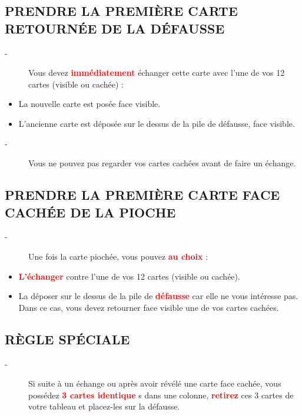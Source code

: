 \documentclass{scrartcl}%
\begin{document}
%
\subsection{ PRENDRE LA PREMIÈRE CARTE RETOURNÉE DE LA DÉFAUSSE
}%
\label{subsec:PRENDRELAPREMIRECARTERETOURNEDELADFAUSSE}%
\begin{description}%
\item[{-} ]%
%
 Vous devez %
\textcolor{red}{%
\textbf{immédiatement}%
}%
\textit{ }%
 échanger cette carte avec l’une de vos 12 cartes (visible ou cachée) :
%
\end{description}%
\begin{itemize}%
\item%
%
 La nouvelle carte est posée face visible.
%
\item%
%
 L'ancienne carte est déposée sur le dessus de la pile de défausse, face visible.
%
\end{itemize}%
\begin{description}%
\item[{-} ]%
%
 Vous ne pouvez pas regarder vos cartes cachées avant de faire un échange.
%
\end{description}

%
\subsection{ PRENDRE LA PREMIÈRE CARTE FACE CACHÉE DE LA PIOCHE
}%
\label{subsec:PRENDRELAPREMIRECARTEFACECACHEDELAPIOCHE}%
\begin{description}%
\item[{-} ]%
%
Une fois la carte piochée, vous pouvez %
\textcolor{red}{%
\textbf{au choix}%
}%
\textit{ }%
 :
%
\end{description}%
\begin{itemize}%
\item%
%
\textcolor{red}{%
\textbf{L'échanger}%
}%
\textit{ }%
 contre l'une de vos 12 cartes (visible ou cachée).
%
\item%
%
 La déposer sur le dessus de la pile de %
\textcolor{red}{%
\textbf{défausse}%
}%
\textit{ }%
 car elle ne vous intéresse pas. Dans ce cas, vous devez retourner face visible une de vos cartes cachées.
%
\end{itemize}

%
\subsection{ RÈGLE SPÉCIALE
}%
\label{subsec:RGLESPCIALE}%
\begin{description}%
\item[{-} ]%
%
 Si suite à un échange ou après avoir révélé une carte face cachée, vous possédez %
\textcolor{red}{%
\textbf{3 cartes identique}%
}%
s dans une colonne, %
\textcolor{red}{%
\textbf{retirez}%
}%
\textit{ }%
 ces 3 cartes de votre tableau et placez{-}les sur la défausse.
%
\end{description}
\end{document}
